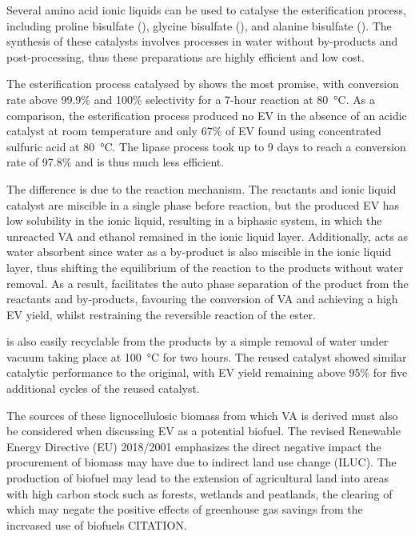 \documentclass[11pt]{article}
\begin{document}
Several amino acid ionic liquids can be used to catalyse the esterification process, including proline bisulfate (), glycine bisulfate (), and alanine bisulfate (). The synthesis of these catalysts involves processes in water without by-products and post-processing, thus these preparations are highly efficient and low cost. 

The esterification process catalysed by  shows the most promise, with conversion rate above 99.9\% and 100\% selectivity for a 7-hour reaction at \SI{80}{\celsius}. As a comparison, the esterification process produced no EV in the absence of an acidic catalyst at room temperature and only 67\% of EV found using concentrated sulfuric acid at \SI{80}{\celsius}. The lipase process took up to 9 days to reach a conversion rate of 97.8\% and is thus much less efficient. 

The difference is due to the reaction mechanism. The reactants and ionic liquid catalyst are miscible in a single phase before reaction, but the produced EV has low solubility in the ionic liquid, resulting in a biphasic system, in which the unreacted VA and ethanol remained in the ionic liquid layer. Additionally,  acts as water absorbent since water as a by-product is also miscible in the ionic liquid layer, thus shifting the equilibrium of the reaction to the products without water removal. As a result,  facilitates the auto phase separation of the product from the reactants and by-products, favouring the conversion of VA and achieving a high EV yield, whilst restraining the reversible reaction of the ester. 

 is also easily recyclable from the products by a simple removal of water under vacuum taking place at \SI{100}{\celsius} for two hours. The reused catalyst showed similar catalytic performance to the original, with EV yield remaining above 95\% for five additional cycles of the reused catalyst.   

The sources of these lignocellulosic biomass from which VA is derived must also be considered when discussing EV as a potential biofuel. The revised Renewable Energy Directive (EU) 2018/2001 emphasizes the direct negative impact the procurement of biomass may have due to indirect land use change (ILUC). The production of biofuel may lead to the extension of agricultural land into areas with high carbon stock such as forests, wetlands and peatlands, the clearing of which may negate the positive effects of greenhouse gas savings from the increased use of biofuels CITATION. 
\end{document}

